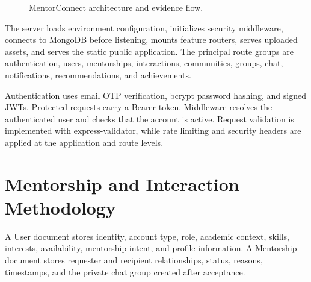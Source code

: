\documentclass[conference]{IEEEtran}
\begin{document}
\begin{figure}[t]
\centering
{}
\caption{MentorConnect architecture and evidence flow.}
\label{fig:architecture}
\end{figure}

The server loads environment configuration, initializes security middleware, connects to MongoDB before listening, mounts feature routers, serves uploaded assets, and serves the static public application. The principal route groups are authentication, users, mentorships, interactions, communities, groups, chat, notifications, recommendations, and achievements.

Authentication uses email OTP verification, bcrypt password hashing, and signed JWTs. Protected requests carry a Bearer token. Middleware resolves the authenticated user and checks that the account is active. Request validation is implemented with express-validator, while rate limiting and security headers are applied at the application and route levels.

\section{Mentorship and Interaction Methodology}
A User document stores identity, account type, role, academic context, skills, interests, availability, mentorship intent, and profile information. A Mentorship document stores requester and recipient relationships, status, reasons, timestamps, and the private chat group created after acceptance.
\end{document}

